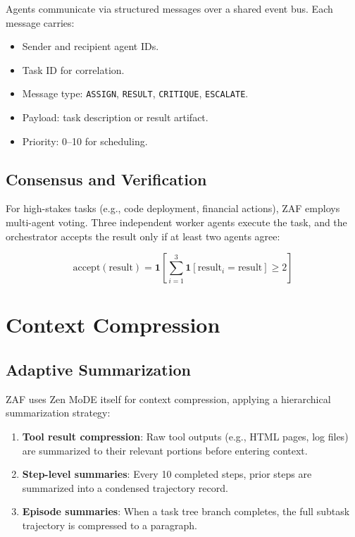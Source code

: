 \documentclass[11pt,a4paper]{article}
\begin{document}
Agents communicate via structured messages over a shared event bus. Each message carries:

\begin{itemize}
  \item Sender and recipient agent IDs.
  \item Task ID for correlation.
  \item Message type: \texttt{ASSIGN}, \texttt{RESULT}, \texttt{CRITIQUE}, \texttt{ESCALATE}.
  \item Payload: task description or result artifact.
  \item Priority: 0--10 for scheduling.
\end{itemize}

\subsection{Consensus and Verification}

For high-stakes tasks (e.g., code deployment, financial actions), ZAF employs multi-agent voting. Three independent worker agents execute the task, and the orchestrator accepts the result only if at least two agents agree:

\begin{equation}
\text{accept}(\text{result}) = \mathbf{1}\!\left[\sum_{i=1}^{3} \mathbf{1}[\text{result}_i = \text{result}] \geq 2\right]
\end{equation}

\section{Context Compression}

\subsection{Adaptive Summarization}

ZAF uses Zen MoDE itself for context compression, applying a hierarchical summarization strategy:

\begin{enumerate}
  \item \textbf{Tool result compression}: Raw tool outputs (e.g., HTML pages, log files) are summarized to their relevant portions before entering context.
  \item \textbf{Step-level summaries}: Every 10 completed steps, prior steps are summarized into a condensed trajectory record.
  \item \textbf{Episode summaries}: When a task tree branch completes, the full subtask trajectory is compressed to a paragraph.
\end{enumerate}
\end{document}
